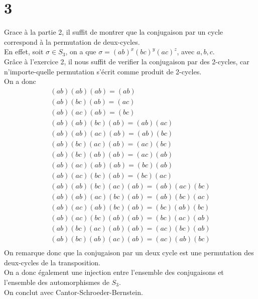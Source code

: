 \documentclass[11pt, a4paper, twoside]{article}
\begin{document}
\section*{3}
Grace à la partie 2, il suffit de montrer que la conjugaison par un cycle correspond à la permutation de deux-cycles.\\
En effet, soit $\sigma \in S_3$, on a que $\sigma = ( ab)^{x}( bc)^{y}( ac)^{z} $, avec $a,b,c$.\\
Grâce à l'exercice 2, il nous suffit de verifier la conjugaison par des 2-cycles, car n'importe-quelle permutation s'écrit comme produit de 2-cycles.\\
On a donc
\begin{align*}
	( ab) ( ab) ( ab) = ( ab) \\
	( ab) ( bc) ( ab) = ( ac) \\
	( ab) ( ac) ( ab) = ( bc) \\
	( ab) ( ab) ( bc) ( ab) = ( ab) ( ac)\\
	( ab) ( ab) ( ac) ( ab) = ( ab) ( bc)\\
	( ab) ( bc) ( ac) ( ab) = ( ac) ( bc)\\
	( ab) ( bc) ( ab) ( ab) = ( ac) ( ab)\\
	( ab) ( ac) ( ab) ( ab) = ( bc) ( ab)\\
	( ab) ( ac) ( bc) ( ab) = ( bc) ( ac)\\
	( ab) ( ab) ( bc) ( ac) ( ab) = ( ab) ( ac) ( bc)\\
	( ab) ( ab) ( ac) ( bc) ( ab) = ( ab) ( bc) ( ac)\\
	( ab) ( ac) ( ab) ( bc) ( ab) = ( bc) ( ab) ( bc) \\
	( ab) ( ac) ( bc) ( ab)( ab)  = ( bc) ( ac) ( ab)\\
	( ab) ( bc) ( ac)( ab)( ab)  =  ( ac) ( bc) ( ab)\\
	( ab) ( bc) ( ab)( ac)( ab)  =  ( ac) ( ab) ( bc) \\
\end{align*}
On remarque donc que la conjugaison par un deux cycle est une permutation des deux-cycles de la transposition.\\
On a donc également une injection entre l'ensemble des conjugaisons et l'ensemble des automorphismes de $S_3$.\\
On conclut avec Cantor-Schroeder-Bernstein.
\end{document}
